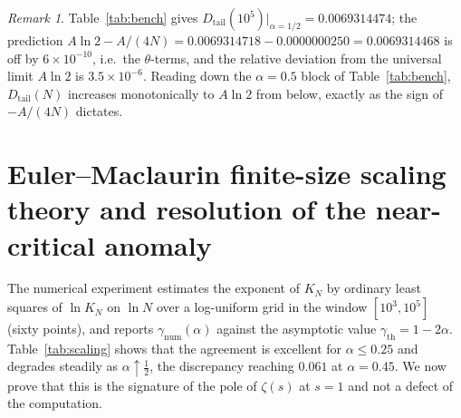 \documentclass[11pt,reqno]{amsart}
\theoremstyle{plain}
\theoremstyle{definition}
\theoremstyle{remark}
\newtheorem{remark}[theorem]{Remark}
\numberwithin{equation}{section}
\newcommand{\Dtail}{D_{\mathrm{tail}}}
\newcommand{\gnum}{\gamma_{\mathrm{num}}}
\newcommand{\gth}{\gamma_{\mathrm{th}}}
\begin{document}
\begin{remark}
Table~\ref{tab:bench} gives $\Dtail(10^5)|_{\alpha=1/2}=0.0069314474$; the prediction $A\ln2-A/(4N)=0.0069314718-0.0000000250=0.0069314468$ is off by $6\times10^{-10}$, i.e.\ the $\theta$-terms, and the relative deviation from the universal limit $A\ln2$ is $3.5\times10^{-6}$. Reading down the $\alpha=0.5$ block of Table~\ref{tab:bench}, $\Dtail(N)$ increases monotonically to $A\ln 2$ from below, exactly as the sign of $-A/(4N)$ dictates.
\end{remark}

\section{Euler--Maclaurin finite-size scaling theory and resolution of the near-critical anomaly}
\label{sec:fss}

The numerical experiment estimates the exponent of $K_N$ by ordinary least squares of $\ln K_N$ on $\ln N$ over a log-uniform grid in the window $[10^3,10^5]$ (sixty points), and reports $\gnum(\alpha)$ against the asymptotic value $\gth=1-2\alpha$. Table~\ref{tab:scaling} shows that the agreement is excellent for $\alpha\le0.25$ and degrades steadily as $\alpha\uparrow\frac12$, the discrepancy reaching $0.061$ at $\alpha=0.45$. We now prove that this is the signature of the pole of $\zeta(s)$ at $s=1$ and not a defect of the computation.
\end{document}
